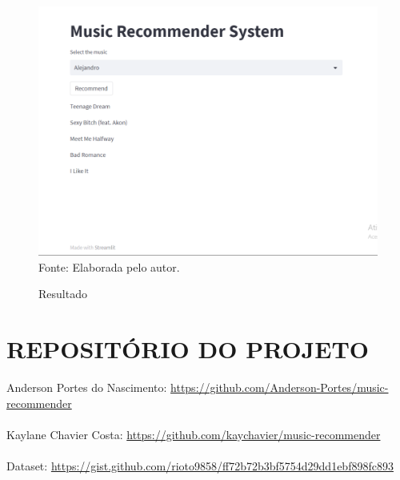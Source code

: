 \documentclass[a4paper, 12pt]{article}
\begin{document}
\begin{figure}[!ht]
        \centering
        \caption{Resultado}
        \includegraphics[scale=0.5]{resultado2.png} \\
        {\footnotesize Fonte: Elaborada pelo autor.}
        \label{fig:my_label}
    \end{figure}

\newpage

\section{REPOSITÓRIO DO PROJETO}
Anderson Portes do Nascimento:
    \url{https://github.com/Anderson-Portes/music-recommender}
\\\\Kaylane Chavier Costa:
    \url{https://github.com/kaychavier/music-recommender}
\\\\Dataset:
\url{https://gist.github.com/rioto9858/ff72b72b3bf5754d29dd1ebf898fc893}
\end{document}
